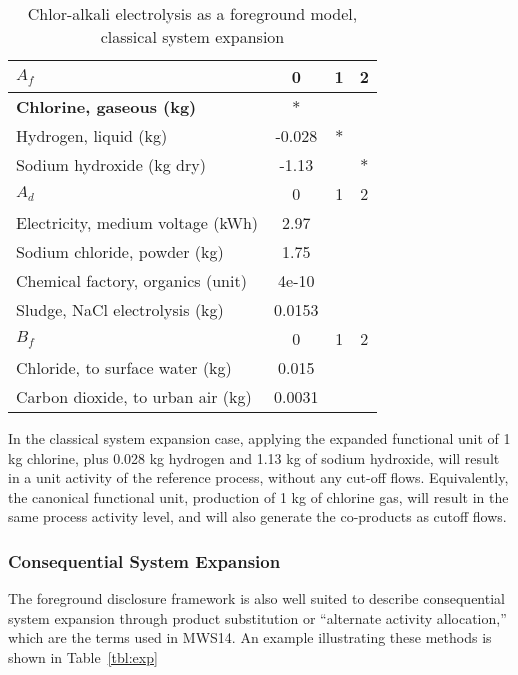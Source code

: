 \begin{table}[h]
  \begin{center}
  \caption{Chlor-alkali electrolysis as a foreground model, classical system expansion}
  \label{tbl:cse}
  \footnotesize\sffamily
  \begin{tabular}{l|ccc}
    \midrule
    \bf $A_f$ & 0 & 1 & 2 \\
    \midrule
    \textbf{Chlorine, gaseous (kg)} & $\ast$ & & \\
    Hydrogen, liquid (kg) & -0.028 & $\ast$ & \\
    Sodium hydroxide (kg dry) & -1.13 & & $\ast$ \\
    \midrule
    \bf $A_d$ & 0 & 1 & 2 \\
    \midrule
    Electricity, medium voltage (kWh) & 2.97 &  &  \\
    Sodium chloride, powder (kg) & 1.75 &  & \\
    Chemical factory, organics (unit) & 4e-10 &  &  \\
    Sludge, NaCl electrolysis (kg) & 0.0153 &  &  \\
    \midrule
    \bf $B_f$ & 0 & 1 & 2 \\
    \midrule
    Chloride, to surface water (kg) & 0.015 &  &  \\
    Carbon dioxide, to urban air (kg) & 0.0031 &  &  \\
    \midrule
  \end{tabular}
  \end{center}
\end{table}

In the classical system expansion case, applying the expanded functional unit of 1 kg chlorine, plus 0.028 kg hydrogen and 1.13 kg of sodium hydroxide, will result in a unit activity of the reference process, without any cut-off flows.  Equivalently, the canonical functional unit, production of 1 kg of chlorine gas, will result in the same process activity level, and will also generate the co-products as cutoff flows.

\subsubsection{Consequential System Expansion}

The foreground disclosure framework is also well suited to describe consequential system expansion through product substitution or ``alternate activity allocation,'' which are the terms used in MWS14.  An example illustrating these methods is shown in Table~\ref{tbl:exp}

